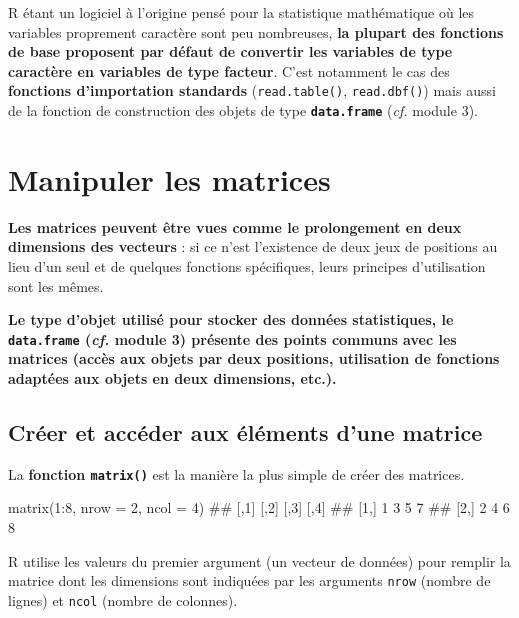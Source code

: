 \documentclass[12pt,twosided, notitlepage]{book}
\newenvironment{Shaded}{}{}
\newcommand{\KeywordTok}[1]{\textcolor[rgb]{0.00,0.00,1.00}{{#1}}}
\newcommand{\DataTypeTok}[1]{{#1}}
\newcommand{\DecValTok}[1]{{#1}}
\newcommand{\NormalTok}[1]{{#1}}
\renewenvironment{Shaded}{\begin{snugshade}}{\end{snugshade}}
\begin{document}
R étant un logiciel à l'origine pensé pour la statistique mathématique
où les variables proprement caractère sont peu nombreuses, \textbf{la
plupart des fonctions de base proposent par défaut de convertir les
variables de type caractère en variables de type facteur}. C'est
notamment le cas des \textbf{fonctions d'importation standards}
(\texttt{read.table()},
\texttt{read.dbf()}) mais aussi de la fonction
de construction des objets de type \textbf{\texttt{data.frame}}
(\emph{cf.} module 3).

\section{Manipuler les matrices}\label{manipuler-les-matrices}

\textbf{Les matrices peuvent être vues comme le prolongement en deux
dimensions des vecteurs} : si ce n'est l'existence de deux jeux de
positions au lieu d'un seul et de quelques fonctions spécifiques, leurs
principes d'utilisation sont les mêmes.

\textbf{Le type d'objet utilisé pour stocker des données statistiques,
le \texttt{data.frame} (\emph{cf.} module 3) présente des points communs
avec les matrices (accès aux objets par deux positions, utilisation de
fonctions adaptées aux objets en deux dimensions, etc.).}

\subsection{Créer et accéder aux éléments d'une
matrice}\label{creer-et-acceder-aux-elements-dune-matrice}

La \textbf{fonction \texttt{matrix()}} est
la manière la plus simple de créer des matrices.

\begin{Shaded}
\begin{Highlighting}[]
\KeywordTok{matrix}\NormalTok{(}\DecValTok{1}\NormalTok{:}\DecValTok{8}\NormalTok{, }\DataTypeTok{nrow =} \DecValTok{2}\NormalTok{, }\DataTypeTok{ncol =} \DecValTok{4}\NormalTok{)}
  \NormalTok{##      [,1] [,2] [,3] [,4]}
  \NormalTok{## [1,]    1    3    5    7}
  \NormalTok{## [2,]    2    4    6    8}
\end{Highlighting}
\end{Shaded}

R utilise les valeurs du premier argument (un vecteur de données) pour
remplir la matrice dont les dimensions sont indiquées par les arguments
\texttt{nrow} (nombre de lignes) et \texttt{ncol} (nombre de colonnes).
\end{document}
